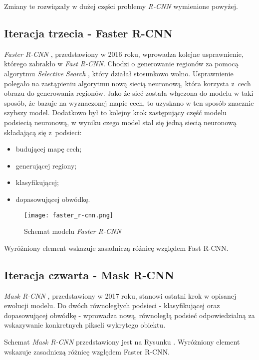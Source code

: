 Zmiany te rozwiązały w dużej części problemy \textit{R-CNN} wymienione powyżej.

\subsection{Iteracja trzecia - Faster R-CNN}

\textit{Faster R-CNN} \cite{faster-rcnn}, przedstawiony w 2016 roku, wprowadza kolejne usprawnienie, którego zabrakło w \textit{Fast R-CNN}.
Chodzi o generowanie regionów za pomocą algorytmu \textit{Selective Search} \cite{selective-search}, który działał stosunkowo wolno.
Usprawnienie polegało na zastąpieniu algorytmu nową siecią neuronową, która korzysta z~cech obrazu do generowania regionów.
Jako że sieć została włączona do modelu w taki sposób, że bazuje na wyznaczonej mapie cech, to uzyskano w ten sposób znacznie szybszy model.
Dodatkowo był to kolejny krok zastępujący część modelu podsiecią neuronową, w wyniku czego model stał się jedną siecią neuronową składającą się z~podsieci:

\begin{itemize}
	\item budującej mapę cech;
	\item generującej regiony;
	\item klasyfikującej;
	\item dopasowującej obwódkę.
\end{itemize}

\begin{figure}[h]
  \centering
  \caption{Schemat modelu \textit{Faster R-CNN}}
  \texttt{[image: faster\_r-cnn.png]}
  \label{fig:faster_r_cnn}
\end{figure}

Wyróżniony element wskazuje zasadniczą różnicę względem Fast R-CNN.

\newpage
\subsection{Iteracja czwarta - Mask R-CNN}
\label{sec:maskrcnn}
\textit{Mask R-CNN} \cite{matterport-mask-rcnn}, przedstawiony w 2017 roku, stanowi ostatni krok w opisanej ewolucji modelu.
Do dwóch równoległych podsieci - klasyfikującej oraz dopasowującej obwódkę - wprowadza nową, równoległą podsieć odpowiedzialną za wskazywanie konkretnych pikseli wykrytego obiektu.

Schemat \textit{Mask R-CNN} przedstawiony jest na Rysunku . Wyróżniony element wskazuje zasadniczą różnicę względem Faster R-CNN.

